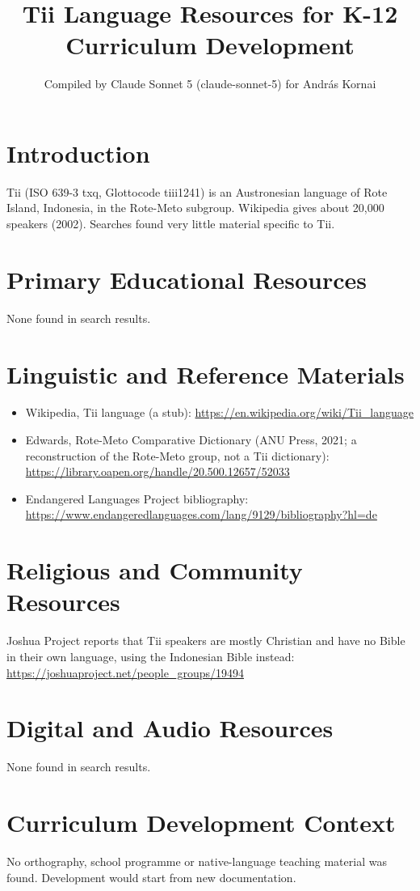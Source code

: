 \documentclass[12pt]{article}
\title{Tii Language Resources for K-12 Curriculum Development}
\author{Compiled by Claude Sonnet 5 (claude-sonnet-5) for Andr\'as Kornai}
\date{}
\begin{document}
\maketitle
\section{Introduction}
Tii (ISO 639-3 txq, Glottocode tiii1241) is an Austronesian language of Rote Island, Indonesia, in the Rote-Meto subgroup. Wikipedia gives about 20,000 speakers (2002). Searches found very little material specific to Tii.
\section{Primary Educational Resources}
None found in search results.
\section{Linguistic and Reference Materials}
\begin{itemize}
\item Wikipedia, Tii language (a stub): \url{https://en.wikipedia.org/wiki/Tii_language}
\item Edwards, Rote-Meto Comparative Dictionary (ANU Press, 2021; a reconstruction of the Rote-Meto group, not a Tii dictionary): \url{https://library.oapen.org/handle/20.500.12657/52033}
\item Endangered Languages Project bibliography: \url{https://www.endangeredlanguages.com/lang/9129/bibliography?hl=de}
\end{itemize}
\section{Religious and Community Resources}
Joshua Project reports that Tii speakers are mostly Christian and have no Bible in their own language, using the Indonesian Bible instead: \url{https://joshuaproject.net/people_groups/19494}
\section{Digital and Audio Resources}
None found in search results.
\section{Curriculum Development Context}
No orthography, school programme or native-language teaching material was found. Development would start from new documentation.
\end{document}
